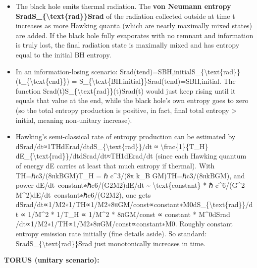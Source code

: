 \documentclass[]{article}
\begin{document}
\begin{itemize}
\item
  The black hole emits thermal radiation. The \textbf{von Neumann
  entropy SradS\_\{\textbackslash{}text\{rad\}\}Srad​} of the radiation
  collected outside at time t increases as more Hawking quanta (which
  are nearly maximally mixed states) are added. If the black hole fully
  evaporates with no remnant and information is truly lost, the final
  radiation state is maximally mixed and has entropy equal to the
  initial BH entropy.
\item
  In an information-losing scenario:
  Srad(tend)=SBH,initialS\_\{\textbackslash{}text\{rad\}\}(t\_\{\textbackslash{}text\{end\}\})
  = S\_\{\textbackslash{}text\{BH,initial\}\}Srad​(tend​)=SBH,initial​.
  The function Srad(t)S\_\{\textbackslash{}text\{rad\}\}(t)Srad​(t)
  would just keep rising until it equals that value at the end, while
  the black hole's own entropy goes to zero (so the total entropy
  production is positive, in fact, final total entropy \textgreater{}
  initial, meaning non-unitary increase).
\item
  Hawking's semi-classical rate of entropy production can be estimated
  by dSrad/dt≈1THdErad/dtdS\_\{\textbackslash{}text\{rad\}\}/dt ≈
  \textbackslash{}frac\{1\}\{T\_H\}
  dE\_\{\textbackslash{}text\{rad\}\}/dtdSrad​/dt≈TH​1​dErad​/dt (since
  each Hawking quantum of energy dE carries at least that much entropy
  if thermal). With TH=ℏc3/(8πkBGM)T\_H = ℏ c\^{}3/(8π k\_B
  GM)TH​=ℏc3/(8πkB​GM), and power dE/dt~constant∗ℏc6/(G2M2)dE/dt
  \textasciitilde{} \textbackslash{}text\{constant\} * ℏ c\^{}6/(G\^{}2
  M\^{}2)dE/dt~constant∗ℏc6/(G2M2), one gets
  dSrad/dt∝1/M2∗1/TH∝1/M2∗8πGM/const∝constant∗M0dS\_\{\textbackslash{}text\{rad\}\}/dt
  ∝ 1/M\^{}2 * 1/T\_H ∝ 1/M\^{}2 * 8πGM/const ∝ constant *
  M\^{}0dSrad​/dt∝1/M2∗1/TH​∝1/M2∗8πGM/const∝constant∗M0. Roughly
  constant entropy emission rate initially (fine details aside). So
  standard: SradS\_\{\textbackslash{}text\{rad\}\}Srad​ just
  monotonically increases in time.
\end{itemize}

\textbf{TORUS (unitary scenario):}
\end{document}
